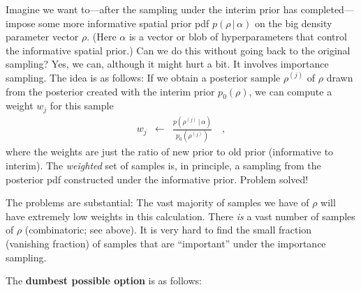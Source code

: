 \documentclass[12pt, letterpaper]{article}
\newcommand{\given}{\,|\,}
\begin{document}
Imagine we want to---after the sampling under the interim prior has completed---%
  impose some more informative spatial prior pdf $p(\rho\given\alpha)$
  on the big density parameter vector $\rho$.
(Here $\alpha$ is a vector or blob of hyperparameters that control the informative spatial prior.)
Can we do this without going back to the original sampling?
Yes, we can, although it might hurt a bit.
It involves importance sampling.
The idea is as follows:
If we obtain a posterior sample $\rho^{(j)}$ of $\rho$ drawn from the posterior
  created with the interim prior $p_0(\rho)$,
  we can compute a weight $w_j$ for this sample
\begin{eqnarray}
w_j & \leftarrow & \frac{p(\rho^{(j)}\given\alpha)}{p_0(\rho^{(j)})}
\quad,
\end{eqnarray}
  where the weights are just the ratio of new prior to old prior (informative to interim).
The \emph{weighted} set of samples is, in principle,
  a sampling from the posterior pdf constructed under the informative prior.
Problem solved!

The problems are substantial:
The vast majority of samples we have of $\rho$ will have extremely low weights in this calculation.
There \emph{is} a vast number of samples of $\rho$ (combinatoric; see above).
It is very hard to find the small fraction (vanishing fraction) of samples that are ``important''
  under the importance sampling.

The \textbf{dumbest possible option} is as follows:
\end{document}
